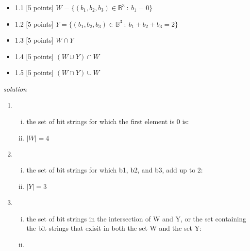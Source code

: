 \documentclass[11pt,twoside]{amsart}
\begin{document}
  \begin{itemize} 
    \itemsep0em 
    \item 1.1 [5 points] $W = \{ (b_1, b_2, b_3) \in  \mathbb{B}^3 \ : \ b_1 = 0 \}$
    \item 1.2 [5 points]  $Y = \{ (b_1, b_2, b_3) \in  \mathbb{B}^3 \ : \ b_1 + b_2 + b_3  = 2 \}$
    \item 1.3 [5 points] $W \cap Y$
    \item 1.4 [5 points] $(W \cup Y) \cap W$
    \item 1.5 [5 points] $(W \cap Y) \cup W$
  \end{itemize}
\bigskip
\emph{solution}
\begin{enumerate}[1.]
     \item
       \begin{enumerate}[i)]
         \item
           the set of bit strings for which the first element is 0 is:
    \begin{center}  \end{center}
         \item
           $|W| = 4$ 
           \bigskip
       \end{enumerate}
     \item
       \begin{enumerate}[i)]
          \item
            the set of bit strings for which b1, b2, and b3, add up to 2: 
            \begin{center}  \end{center}
            
          \item
            $|Y| = 3$
            \bigskip
        \end{enumerate}
     \item
        \begin{enumerate}[i)]
          \item
          the set of bit strings in the intersection of W and Y, or the set containing the bit strings that exisit in both the set W and the set Y:
     \begin{center}  \end{center}
          \bigskip
          \item
            \newpage
          \end{enumerate}
      

\end{enumerate}
\end{document}
